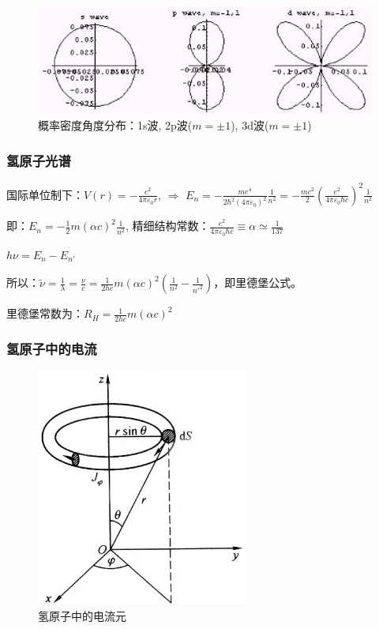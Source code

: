 \begin{figure}[h]
\begin{center}
\includegraphics[clip,width=\textwidth]{HydrogenAtom/15-3.ps}
\caption{概率密度角度分布：1s波, 2p波($m = \pm 1$), 3d波($m = \pm 1$)}
\end{center}
\end{figure}

\subsubsection{氢原子光谱}

国际单位制下：$V(r) =  - \frac{{e^2 }}{{4\pi \varepsilon _0 r}}$, $\Rightarrow$
$E_n  =  - \frac{{me^4 }}{{2\hbar ^2 \left( {4\pi \varepsilon _0 } \right)^2 }}\frac{1}{{n^2 }} =  - \frac{{mc^2 }}{2}\left( {\frac{{e^2 }}{{4\pi \varepsilon _0 \hbar c}}} \right)^2 \frac{1}{{n^2 }}$

即：$E_n  =  - \frac{1}{2}m\left( {\alpha c} \right)^2 \frac{1}{{n^2 }}$, 精细结构常数：$\frac{{e^2 }}{{4\pi \varepsilon _0 \hbar c}} \equiv \alpha  \simeq \frac{1}{{137}}$

$h\nu  = E_n  - E_{n'} $

所以：$\tilde \nu  = \frac{1}{\lambda } = \frac{\nu }{c} = \frac{1}{{2hc}}m\left( {\alpha c} \right)^2 \left( {\frac{1}{{n^2 }} - \frac{1}{{n'^2 }}} \right)$，即里德堡公式。

里德堡常数为：$R_H  = \frac{1}{{2hc}}m\left( {\alpha c} \right)^2 $



\subsubsection{氢原子中的电流}

\begin{figure}[h]
\begin{center}
\includegraphics[clip,width=7cm]{HydrogenAtom/15-4.ps}
\caption{氢原子中的电流元}
\end{center}
\end{figure}

